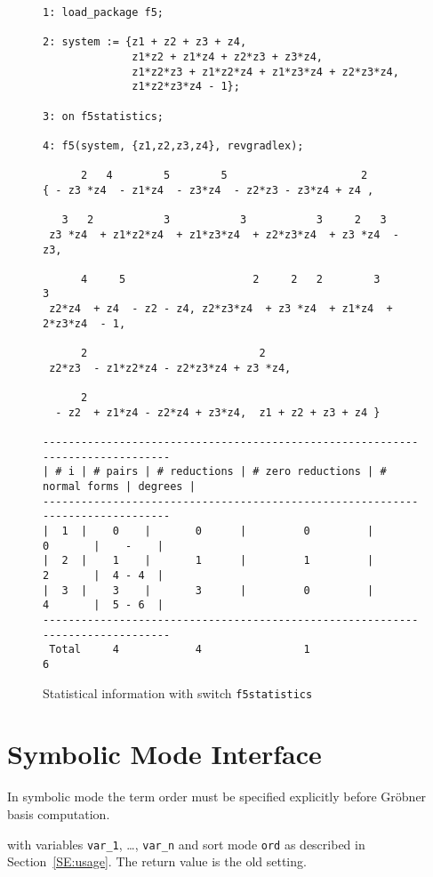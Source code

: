 \documentclass{article}
\newcommand{\grobner}{Gr\"obner}
\newcommand{\code}[1]{\texttt{#1}}
\begin{document}
%
\begin{figure}[p]
\footnotesize
\begin{verbatim}
1: load_package f5;

2: system := {z1 + z2 + z3 + z4, 
              z1*z2 + z1*z4 + z2*z3 + z3*z4,
              z1*z2*z3 + z1*z2*z4 + z1*z3*z4 + z2*z3*z4, 
              z1*z2*z3*z4 - 1};

3: on f5statistics;

4: f5(system, {z1,z2,z3,z4}, revgradlex);

      2   4        5        5                     2
{ - z3 *z4  - z1*z4  - z3*z4  - z2*z3 - z3*z4 + z4 ,

   3   2           3           3           3     2   3
 z3 *z4  + z1*z2*z4  + z1*z3*z4  + z2*z3*z4  + z3 *z4  - z3,

      4     5                    2     2   2        3          3
 z2*z4  + z4  - z2 - z4, z2*z3*z4  + z3 *z4  + z1*z4  + 2*z3*z4  - 1,

      2                           2
 z2*z3  - z1*z2*z4 - z2*z3*z4 + z3 *z4,

      2
  - z2  + z1*z4 - z2*z4 + z3*z4,  z1 + z2 + z3 + z4 }

-------------------------------------------------------------------------------
| # i | # pairs | # reductions | # zero reductions | # normal forms | degrees |
-------------------------------------------------------------------------------
|  1  |    0    |       0      |         0         |        0       |    -    |
|  2  |    1    |       1      |         1         |        2       |  4 - 4  |
|  3  |    3    |       3      |         0         |        4       |  5 - 6  |
-------------------------------------------------------------------------------
 Total     4            4                1                  6
\end{verbatim}
\caption{Statistical information with switch \code{f5statistics}
\label{fig:stat}}
\end{figure}
%
\section{Symbolic Mode Interface}

In symbolic mode the term order must be specified explicitly before \grobner{} basis computation.
%
\begin{description}\sloppy
\item[\code{torder(\{\{'list, var\_1, \ldots, var\_n\}, ord\}):}] with variables \code{var\_1},
\dots, \code{var\_n} and sort mode \code{ord} as described in Section~\ref{SE:usage}. The return
value is the old setting.
\end{description}
\end{document}
